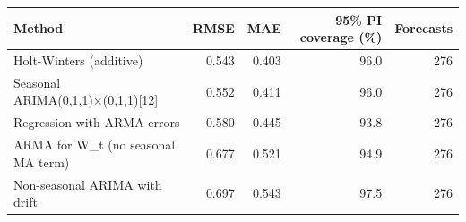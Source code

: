 
\begin{tabular}[t]{lrrrr}
\toprule
Method & RMSE & MAE & 95\% PI coverage (\%) & Forecasts\\
\midrule
Holt-Winters (additive) & 0.543 & 0.403 & 96.0 & 276\\
Seasonal ARIMA(0,1,1)×(0,1,1)[12] & 0.552 & 0.411 & 96.0 & 276\\
Regression with ARMA errors & 0.580 & 0.445 & 93.8 & 276\\
ARMA for W\_t (no seasonal MA term) & 0.677 & 0.521 & 94.9 & 276\\
Non-seasonal ARIMA with drift & 0.697 & 0.543 & 97.5 & 276\\
\bottomrule
\end{tabular}
